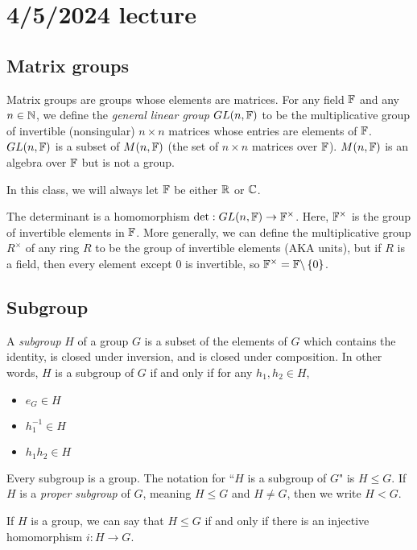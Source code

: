 \documentclass[class=article, crop=false]{standalone}
\begin{document}
\section{4/5/2024 lecture}

\subsection{Matrix groups}
Matrix groups are groups whose elements are matrices. For any field $\mathbb{F}$ and any $n \in \mathbb{N}$, we define the \emph{general linear group $GL(n,\mathbb{F})$} to be the multiplicative group of invertible (nonsingular) $n \times n$ matrices whose entries are elements of $\mathbb{F}$. $GL(n, \mathbb{F})$ is a subset of $M(n,\mathbb{F})$ (the set of $n \times n$ matrices over $\mathbb{F}$). $M(n,\mathbb{F})$ is an algebra over $\mathbb{F}$ but is not a group.
\begin{note}
    In this class, we will always let $\mathbb{F}$ be either $\mathbb{R}$ or $\mathbb{C}$.
\end{note}
The determinant is a homomorphism $\det: GL(n,\mathbb{F}) \rightarrow \mathbb{F}^\times$. Here, $\mathbb{F}^\times$ is the group of invertible elements in $\mathbb{F}$. More generally, we can define the multiplicative group $R^\times$ of any ring $R$ to be the group of invertible elements (AKA units), but if $R$ is a field, then every element except 0 is invertible, so $\mathbb{F}^\times = \mathbb{F} \backslash \left\{ 0 \right\}$.

\subsection{Subgroup}
A \emph{subgroup} $H$ of a group $G$ is a subset of the elements of $G$ which contains the identity, is closed under inversion, and is closed under composition. In other words, $H$ is a subgroup of $G$ if and only if for any $h_1, h_2 \in H$,
\begin{itemize}
    \item $e_G \in H$
    \item $h_1^{-1} \in H$
    \item $h_1 h_2 \in H$
\end{itemize}
Every subgroup is a group. The notation for ``$H$ is a subgroup of $G$" is $H \leq G$. If $H$ is a \emph{proper subgroup} of $G$, meaning $H \leq G$ and $H \neq G$, then we write $H < G$.
\par
If $H$ is a group, we can say that $H \leq G$ if and only if there is an injective homomorphism $i: H \rightarrow G$.
\end{document}
